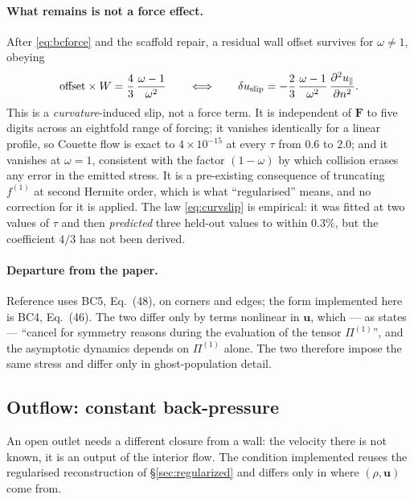 \documentclass[11pt,a4paper]{article}
\newcommand{\uu}{\bm{u}}
\newcommand{\e}[1]{\times 10^{#1}}
\begin{document}
\paragraph{What remains is not a force effect.} After \eqref{eq:bcforce} and the
scaffold repair, a residual wall offset survives for $\omega\neq1$, obeying
\begin{equation}
  \text{offset}\times W = \frac{4}{3}\,\frac{\omega-1}{\omega^{2}}
  \qquad\Longleftrightarrow\qquad
  \delta u_{\rm slip} = -\frac{2}{3}\,\frac{\omega-1}{\omega^{2}}
                        \,\frac{\partial^2 u_\parallel}{\partial n^2}.
  \label{eq:curvslip}
\end{equation}
This is a \emph{curvature}-induced slip, not a force term. It is independent of
$\bm F$ to five digits across an eightfold range of forcing; it vanishes
identically for a linear profile, so Couette flow is exact to $4\e{-15}$ at
every $\tau$ from $0.6$ to $2.0$; and it vanishes at $\omega=1$, consistent with
the factor $(1-\omega)$ by which collision erases any error in the emitted
stress. It is a pre-existing consequence of truncating $f^{(1)}$ at second
Hermite order, which is what ``regularised'' means, and no correction for it is
applied. The law \eqref{eq:curvslip} is empirical: it was fitted at two values
of $\tau$ and then \emph{predicted} three held-out values to within $0.3\%$, but
the coefficient $4/3$ has not been derived.

\paragraph{Departure from the paper.} Reference \cite{latt2008} uses BC5,
Eq.~(48), on corners and edges; the form implemented here is BC4, Eq.~(46).
The two differ only by terms nonlinear in $\uu$, which --- as \cite{latt2008}
states --- ``cancel for symmetry reasons during the evaluation of the tensor
$\Pi^{(1)}$'', and the asymptotic dynamics depends on $\Pi^{(1)}$ alone. The two
therefore impose the same stress and differ only in ghost-population detail.

\subsection{Outflow: constant back-pressure}
\label{sec:outflow}

An open outlet needs a different closure from a wall: the velocity there is not
known, it is an output of the interior flow. The condition implemented reuses
the regularised reconstruction of \S\ref{sec:regularized} and differs only in
where $(\rho,\uu)$ come from.
\end{document}
